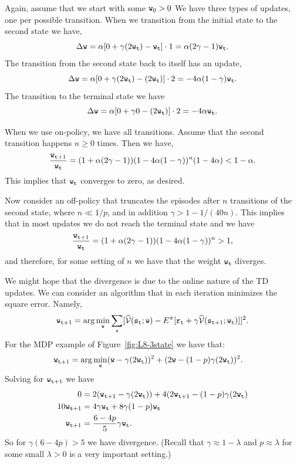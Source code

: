 Again, assume that we start with some ${\tt w}_0>0$ We have three
types of updates, one per possible transition. When we transition
from the initial state to the second state we have,
\[
\Delta {\tt w}= \alpha[0+\gamma
(2{\tt w}_{\tt t})-{\tt w}_{\tt t}]\cdot
1=\alpha(2\gamma-1){\tt w}_{\tt t}.
\]
The transition from the second state back to itself has an update,
\[
\Delta {\tt w}= \alpha[0+\gamma
(2{\tt w}_{\tt t})-(2{\tt w}_{\tt t})]\cdot 2
=-4\alpha(1-\gamma){\tt w}_{\tt t}.
\]
The transition to the terminal state we have
\[
\Delta {\tt w}= \alpha[0+\gamma 0 -(2{\tt w}_{\tt t})]\cdot
2=-4\alpha {\tt w}_{\tt t}.
\]



When we use on-policy, we have all transitions. Assume that the
second transition happens $n\geq 0$ times. Then we have,
\[
\frac{{\tt w}_{{\tt t}+1}}{{\tt w}_{\tt t}}=(1+\alpha(2\gamma-1))(1-4\alpha(1-\gamma))^n(1-4\alpha)<
1-\alpha.
\]
This implies that ${\tt w}_{\tt t}$ converges to zero, as desired.

Now consider an off-policy that truncates the episodes after $n$
transitions of the second state, where $n\ll 1/p$, and in addition
$\gamma> 1-1/(40n)$. This implies that in most updates we do not
reach the terminal state and we have
\[
\frac{{\tt w}_{{\tt t}+1}}{{\tt w}_{\tt t}}=(1+\alpha(2\gamma-1))(1-4\alpha(1-\gamma))^n>1,
\]
and therefore, for some setting of $n$ we have that the weight
${\tt w}_{\tt t}$ diverges.

We might hope that the divergence is due to the online nature of the
TD updates. We can consider an algorithm that in each iteration
minimizes the square error. Namely,
\[
{\tt w}_{{\tt t}+1}=\arg\min_{\tt w}\sum_s
[\widehat{\mathcal{V}}({\tt s}_{\tt t};{\tt w})-E^\pi[{\tt r}_{\tt t}+\gamma\widehat{\mathcal{V}}({\tt s}_{{\tt t}+1};{\tt w}_{\tt t})]]^2.
\]
For the MDP example of Figure~\ref{fig:L8-3state} we have that:
\begin{align*}
 {\tt w}_{{\tt t}+1} &= \arg\min_{\tt w} ({\tt w}-\gamma(2{\tt w}_{\tt t}))^2+(2{\tt w}-(1-p)\gamma(2{\tt w}_{\tt t}))^2.
\end{align*}
Solving for ${\tt w}_{{\tt t}+1}$ we have
\begin{align*}
0&=  2({\tt w}_{{\tt t}+1}-\gamma(2{\tt w}_{\tt t}))+4(2{\tt w}_{{\tt t}+1}-(1-p)\gamma(2{\tt w}_{\tt t})\\
  10 {\tt w}_{{\tt t}+1}&=4\gamma {\tt w}_{\tt t} + 8\gamma(1-p){\tt w}_{\tt t}\\
  {\tt w}_{{\tt t}+1}&=\frac{6-4p}{5}\gamma {\tt w}_{\tt t}.
\end{align*}
So for $\gamma(6-4p)>5$ we have divergence. (Recall that
$\gamma\approx 1-\lambda$ and $p\approx \lambda$ for some small $\lambda>0$ is a very
important setting.)

